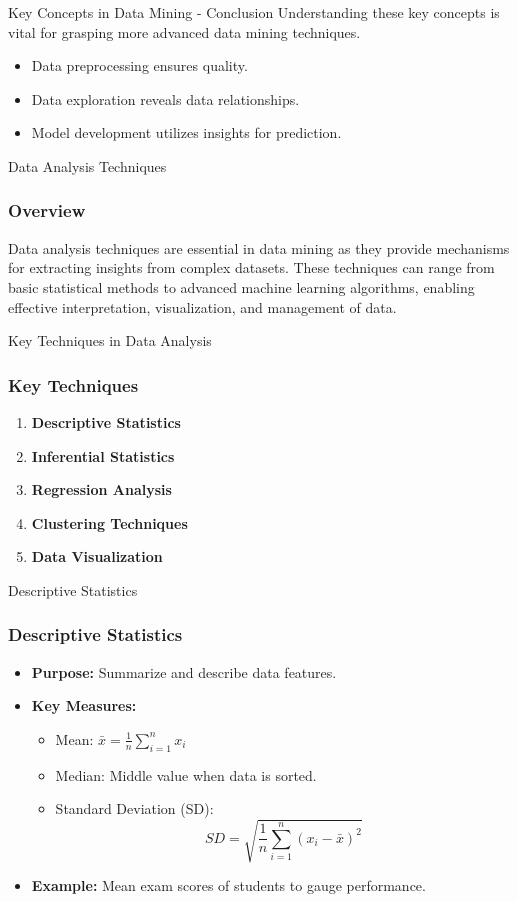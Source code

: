 \documentclass[aspectratio=169]{beamer}
\begin{document}
\begin{frame}[fragile]{Key Concepts in Data Mining - Conclusion}
    Understanding these key concepts is vital for grasping more advanced data mining techniques. 
    \begin{itemize}
        \item Data preprocessing ensures quality.
        \item Data exploration reveals data relationships.
        \item Model development utilizes insights for prediction.
    \end{itemize}
\end{frame}

\begin{frame}{Data Analysis Techniques}
    \frametitle{Overview}
    Data analysis techniques are essential in data mining as they provide mechanisms for extracting insights from complex datasets. These techniques can range from basic statistical methods to advanced machine learning algorithms, enabling effective interpretation, visualization, and management of data.
\end{frame}

\begin{frame}{Key Techniques in Data Analysis}
    \frametitle{Key Techniques}
    \begin{enumerate}
        \item \textbf{Descriptive Statistics}
        \item \textbf{Inferential Statistics}
        \item \textbf{Regression Analysis}
        \item \textbf{Clustering Techniques}
        \item \textbf{Data Visualization}
    \end{enumerate}
\end{frame}

\begin{frame}{Descriptive Statistics}
    \frametitle{Descriptive Statistics}
    \begin{itemize}
        \item \textbf{Purpose:} Summarize and describe data features.
        \item \textbf{Key Measures:}
        \begin{itemize}
            \item Mean: \(\bar{x} = \frac{1}{n} \sum_{i=1}^{n} x_i\)
            \item Median: Middle value when data is sorted.
            \item Standard Deviation (SD): 
            \begin{equation}
                SD = \sqrt{\frac{1}{n} \sum_{i=1}^{n} (x_i - \bar{x})^2} 
            \end{equation}
        \end{itemize}
        \item \textbf{Example:} Mean exam scores of students to gauge performance.
    \end{itemize}
\end{frame}
\end{document}
